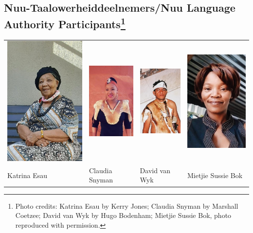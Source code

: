 \newpage


\markboth{}{}
\subsection*{N\textipa{\textvertline}uu-Taalowerheiddeelnemers/N\textipa{\textvertline}uu
Language Authority Participants\footnote{Photo credits: Katrina Esau
by Kerry Jones; Claudia Snyman by Marshall Coetzee; David van Wyk by
Hugo Bodenham; Mietjie Sussie Bok, photo reproduced with permission.}}
\markboth{}{}

\begin{tabular}{llll}
    \includegraphics[width=.2\textwidth]{katrina_s.jpg} &
    \includegraphics[width=.2\textwidth]{claudia_s.jpg} &
    \includegraphics[width=.2\textwidth]{david_s.jpg} &
    \includegraphics[width=.2\textwidth]{mietjie_s.png} \\
Katrina Esau & Claudia Snyman & David van Wyk & Mietjie Sussie Bok\\
\end{tabular}


